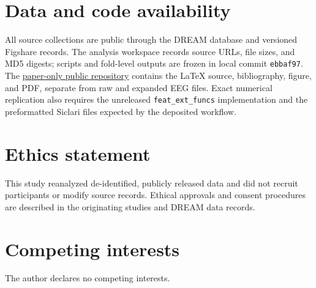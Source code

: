 \documentclass[10pt,twocolumn]{article}
\newcommand{\code}[1]{\texttt{#1}}
\begin{document}
\section*{Data and code availability}

All source collections are public through the DREAM database and versioned
Figshare records. The analysis workspace records source URLs, file sizes, and
MD5 digests; scripts and fold-level outputs are frozen in local commit
\code{ebbaf97}. The \href{https://github.com/asim-v/dream-decoder-generalization-paper}{paper-only
public repository} contains the \LaTeX{} source, bibliography, figure, and PDF,
separate from raw and expanded EEG files. Exact numerical replication also
requires the unreleased
\code{feat\_ext\_funcs} implementation and the preformatted Siclari files
expected by the deposited workflow.

\section*{Ethics statement}

This study reanalyzed de-identified, publicly released data and did not recruit
participants or modify source records. Ethical approvals and consent procedures
are described in the originating studies and DREAM data records.

\section*{Competing interests}

The author declares no competing interests.

\balance


\end{document}
